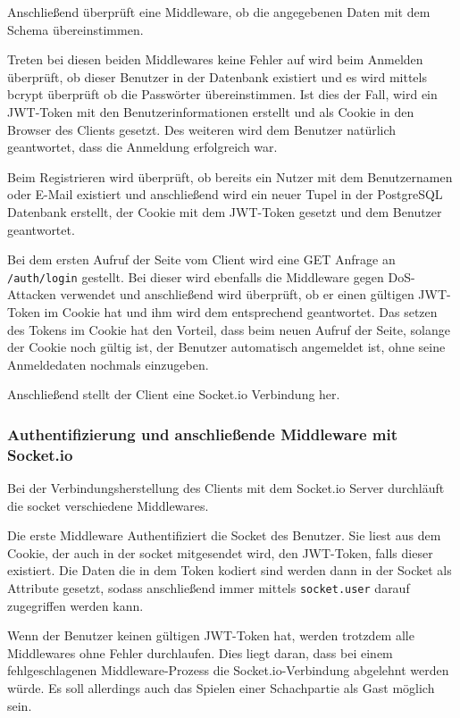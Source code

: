 Anschließend überprüft eine Middleware, ob die angegebenen Daten mit dem Schema übereinstimmen. 

Treten bei diesen beiden Middlewares keine Fehler auf wird beim Anmelden überprüft, ob dieser Benutzer in der Datenbank existiert und es wird mittels bcrypt überprüft ob die Passwörter übereinstimmen. Ist dies der Fall, wird ein JWT-Token mit den Benutzerinformationen erstellt und als Cookie in den Browser des Clients gesetzt. Des weiteren wird dem Benutzer natürlich geantwortet, dass die Anmeldung erfolgreich war.

Beim Registrieren wird überprüft, ob bereits ein Nutzer mit dem Benutzernamen oder E-Mail existiert und anschließend wird ein neuer Tupel in der PostgreSQL Datenbank erstellt, der Cookie mit dem JWT-Token gesetzt und dem Benutzer geantwortet.

Bei dem ersten Aufruf der Seite vom Client wird eine GET Anfrage an \verb|/auth/login| gestellt. Bei dieser wird ebenfalls die Middleware gegen DoS-Attacken verwendet und anschließend wird überprüft, ob er einen gültigen JWT-Token im Cookie hat und ihm wird dem entsprechend geantwortet. Das setzen des Tokens im Cookie hat den Vorteil, dass beim neuen Aufruf der Seite, solange der Cookie noch gültig ist, der Benutzer automatisch angemeldet ist, ohne seine Anmeldedaten nochmals einzugeben.

Anschließend stellt der Client eine Socket.io Verbindung her.

\subsubsection{Authentifizierung und anschließende Middleware mit Socket.io}
Bei der Verbindungsherstellung des Clients mit dem Socket.io Server durchläuft die socket verschiedene Middlewares.

Die erste Middleware Authentifiziert die Socket des Benutzer. Sie liest aus dem Cookie, der auch in der socket mitgesendet wird, den JWT-Token, falls dieser existiert. Die Daten die in dem Token kodiert sind werden dann in der Socket als Attribute gesetzt, sodass anschließend immer mittels \verb|socket.user| darauf zugegriffen werden kann.

Wenn der Benutzer keinen gültigen JWT-Token hat, werden trotzdem alle Middlewares ohne Fehler durchlaufen. Dies liegt daran, dass bei einem fehlgeschlagenen Middleware-Prozess die Socket.io-Verbindung abgelehnt werden würde. Es soll allerdings auch das Spielen einer Schachpartie als Gast möglich sein.

